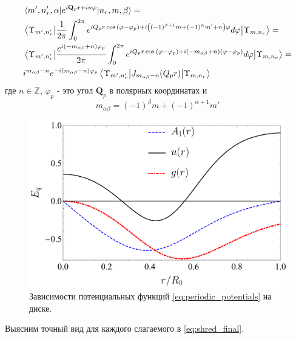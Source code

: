 \documentclass[a4paper,article,14pt]{extarticle}
\begin{document}
\begin{equation}
\label{eq:matrix_elem_k}
\begin{aligned}
&\mel{m', n'_r, \alpha} {e^{i \mathbf{Q}_p\mathbf{r} + i n \varphi} } {n_r,m, \beta} = \\ &\mel{\Upsilon_{m', n'_r}} {\frac{1}{2 \pi}\int _{0}^{ 2 \pi } e^{i Q_p r \cos{\left( \varphi - \varphi_p  \right)} + i \left((-1)^{\beta+1}m + (-1)^{\alpha} m'  + n \right)  \varphi}    d\varphi} {\Upsilon_{m, n_r}} =  \\
& \mel{\Upsilon_{m', n'_r}} {\frac{  e^{i \left(-m_{\alpha \beta}  + n \right)  \varphi_p}}{2 \pi}\int _{0}^{ 2 \pi } e^{i Q_p r \cos{\left( \varphi - \varphi_p  \right)} + i \left(-m_{\alpha \beta}  + n \right)  (\varphi-\varphi_p) }    d\varphi} {\Upsilon_{m, n_r}} =\\
& i^{m_{\alpha \beta} - n} e^{-i (m_{\alpha \beta} - n)  \varphi_p}  \mel{\Upsilon_{m', n'_r}} {J_{m_{\alpha \beta} - n } (Q_p r) }{\Upsilon_{m, n_r}}
\end{aligned}
\end{equation}
где $n \in\mathbb{Z}$, $\varphi_p$ - это угол $\mathbf{Q}_p$ в полярных координатах и 
\begin{equation}
\label{eq:m_alpha_beta}
m_{\alpha \beta} = (-1)^{\beta}m + (-1)^{\alpha+1} m'
\end{equation}

\begin{figure}[t]
\centering	
\includegraphics[width=0.9\columnwidth]{images/potentials_h.pdf}
\caption{Зависимости потенциальных функций \eqref{eq:periodic_potentials} на диске.}
\label{fig:potentials_h}
\end{figure}

Выясним точный вид для каждого слагаемого в \eqref{eq:shred_final}. 
\end{document}
